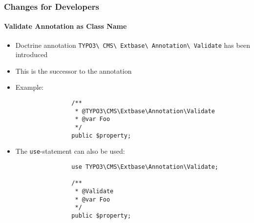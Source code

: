 
\begin{frame}[fragile]
	\frametitle{Changes for Developers}
	\framesubtitle{Validate Annotation as Class Name}

	\lstset{basicstyle=\tiny\ttfamily}

	\begin{itemize}
		\item Doctrine annotation
			\texttt{TYPO3\textbackslash
				CMS\textbackslash
				Extbase\textbackslash
				Annotation\textbackslash
				Validate} has been introduced
		\item This is the successor to the \texttt{\@validate} annotation
		\item Example:

			\begin{lstlisting}
				/**
				 * @TYPO3\CMS\Extbase\Annotation\Validate
				 * @var Foo
				 */
				public $property;
			\end{lstlisting}

		\item The \texttt{use}-statement can also be used:

			\begin{lstlisting}
				use TYPO3\CMS\Extbase\Annotation\Validate;

				/**
				 * @Validate
				 * @var Foo
				 */
				public $property;
			\end{lstlisting}

	\end{itemize}

\end{frame}



